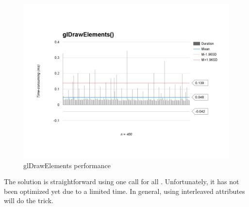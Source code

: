 \begin{figure}[H]
	\caption{glDrawElements performance}
	\label{fig:glDrawElements-performance}
	\centering
	\includegraphics[width=\textwidth, keepaspectratio]{Figures/glDrawElements-performance.png}
	\decoRule
\end{figure}

The solution is straightforward using one  call for all . Unfortunately, it has not been optimized yet due to a limited time. In general, using interleaved attributes will do the trick.

